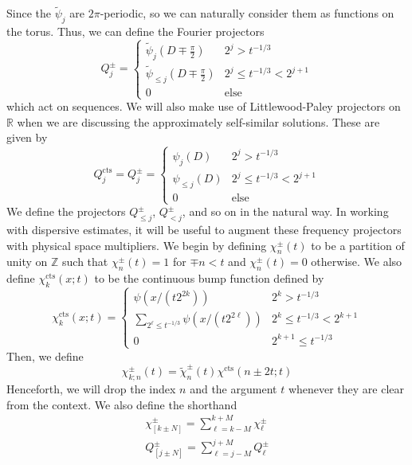 \documentclass[letterpaper, reqno,final]{amsart}
\newcommand{\bbZ}{\mathbb{Z}}
\newcommand{\bbR}{\mathbb{R}}
\newcommand{\fhPi}{\frac{\pi}{2}}
\newcommand{\tcts}{\text{cts}}
\begin{document}
Since the $\tilde{\psi}_j$ are $2\pi$-periodic, so we can naturally consider them as functions on the torus.  Thus, we can define the Fourier projectors
\begin{equation*}
    Q^\pm_j = \begin{cases}
        \tilde{\psi}_j(D \mp \fhPi) & 2^j > t^{-1/3}\\
        \tilde{\psi}_{\leq j}(D \mp \fhPi) & 2^{j} \leq t^{-1/3} < 2^{j+1}\\
        0 & \text{else}
    \end{cases}
\end{equation*}
which act on sequences.  We will also make use of Littlewood-Paley projectors on $\bbR$ when we are discussing the approximately self-similar solutions.  These are given by
\begin{equation*}
    Q_j^\tcts =
    Q^\pm_j = \begin{cases}
        {\psi}_j(D) & 2^j > t^{-1/3}\\
        {\psi}_{\leq j}(D) & 2^{j} \leq t^{-1/3} < 2^{j+1}\\
        0 & \text{else}
    \end{cases}
\end{equation*}
We define the projectors $Q^\pm_{\leq j}$, $Q^\pm_{<j}$, and so on in the natural way.  In working with dispersive estimates, it will be useful to augment these frequency projectors with physical space multipliers.  We begin by defining $\chi^\pm_n(t)$ to be a partition of unity on $\bbZ$ such that $\chi_n^\pm(t) = 1$ for $\mp n < t$ and $\chi_n^\pm(t) = 0$ otherwise.  We also define $\chi^\tcts_k(x;t)$ to be the continuous bump function defined by
\begin{equation*}
    \chi_k^\tcts(x;t) = \begin{cases}
        \psi(x/(t2^{2k})) & 2^k > t^{-1/3}\\
        \sum_{2^\ell \leq t^{-1/3}} \psi(x/(t2^{2\ell})) & 2^{k} \leq t^{-1/3} < 2^{k+1}\\
        0 & 2^{k+1} \leq t^{-1/3}
    \end{cases}
\end{equation*}
Then, we define
\begin{equation*}
    \chi^\pm_{k;n}(t) = \tilde{\chi}^\pm_n(t) \chi^\tcts(n \pm 2t;t)
\end{equation*}
Henceforth, we will drop the index $n$ and the argument $t$ whenever they are clear from the context.  We also define the shorthand
\begin{equation*}\begin{split}
    \chi_{[k \pm N]}^\pm = \sum_{\ell = k -M}^{k+M} \chi_{\ell}^\pm\\
    Q_{[j \pm N]}^\pm = \sum_{\ell = j -M}^{j+M} Q_{\ell}^\pm
\end{split}\end{equation*}
    
\end{document}
